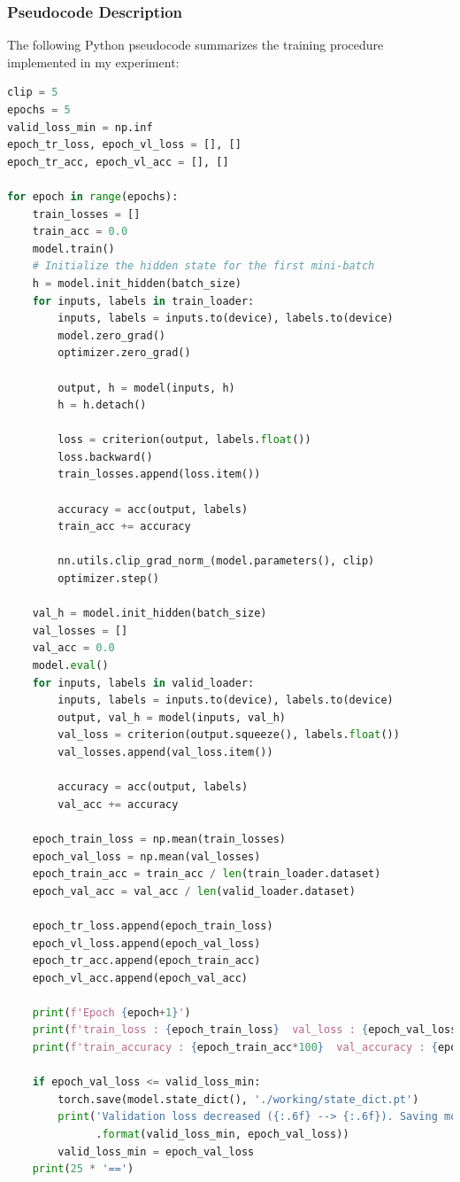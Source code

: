 \documentclass[12pt,a4paper]{article}
\begin{document}
\subsubsection{Pseudocode Description}
The following Python pseudocode summarizes the training procedure implemented in my experiment:

\begin{lstlisting}[language=Python, caption={Training Loop Pseudocode}]
clip = 5
epochs = 5 
valid_loss_min = np.inf
epoch_tr_loss, epoch_vl_loss = [], []
epoch_tr_acc, epoch_vl_acc = [], []

for epoch in range(epochs):
    train_losses = []
    train_acc = 0.0
    model.train()
    # Initialize the hidden state for the first mini-batch
    h = model.init_hidden(batch_size)
    for inputs, labels in train_loader:
        inputs, labels = inputs.to(device), labels.to(device)
        model.zero_grad()
        optimizer.zero_grad()
        
        output, h = model(inputs, h)
        h = h.detach()
        
        loss = criterion(output, labels.float())
        loss.backward()
        train_losses.append(loss.item())
        
        accuracy = acc(output, labels)
        train_acc += accuracy
        
        nn.utils.clip_grad_norm_(model.parameters(), clip)
        optimizer.step()
    
    val_h = model.init_hidden(batch_size)
    val_losses = []
    val_acc = 0.0
    model.eval()
    for inputs, labels in valid_loader:
        inputs, labels = inputs.to(device), labels.to(device)
        output, val_h = model(inputs, val_h)
        val_loss = criterion(output.squeeze(), labels.float())
        val_losses.append(val_loss.item())
        
        accuracy = acc(output, labels)
        val_acc += accuracy
    
    epoch_train_loss = np.mean(train_losses)
    epoch_val_loss = np.mean(val_losses)
    epoch_train_acc = train_acc / len(train_loader.dataset)
    epoch_val_acc = val_acc / len(valid_loader.dataset)
    
    epoch_tr_loss.append(epoch_train_loss)
    epoch_vl_loss.append(epoch_val_loss)
    epoch_tr_acc.append(epoch_train_acc)
    epoch_vl_acc.append(epoch_val_acc)
    
    print(f'Epoch {epoch+1}')
    print(f'train_loss : {epoch_train_loss}  val_loss : {epoch_val_loss}')
    print(f'train_accuracy : {epoch_train_acc*100}  val_accuracy : {epoch_val_acc*100}')
    
    if epoch_val_loss <= valid_loss_min:
        torch.save(model.state_dict(), './working/state_dict.pt')
        print('Validation loss decreased ({:.6f} --> {:.6f}). Saving model...'
              .format(valid_loss_min, epoch_val_loss))
        valid_loss_min = epoch_val_loss
    print(25 * '==')
\end{lstlisting}
\newpage
\end{document}
